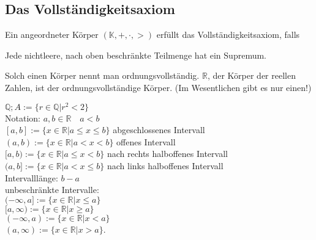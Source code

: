 \documentclass[../ana1.tex]{subfiles}
\begin{document}
\subsection{Das Vollständigkeitsaxiom}
\begin{defi}
	Ein angeordneter Körper \( (\mathbb{K},+,\cdot,>)\) erfüllt das Vollständigkeitsaxiom, falls
	\begin{center}
		Jede nichtleere, nach oben beschränkte Teilmenge hat ein Supremum.
	\end{center}
	Solch einen Körper nennt man ordnungsvollständig. \(\mathbb{R}\), der Körper der reellen Zahlen, ist der ordnungsvollständige Körper. (Im Wesentlichen gibt es nur einen!)
\end{defi}
\( \mathbb{Q}; A:= \{r\in\mathbb{Q}|r^2 < 2\} \) \\
Notation: 
\(a,b\in\mathbb{R} \quad a<b\) \\
\([a,b] := \{x\in\mathbb{R}|a\leq x\leq b\} \) abgeschlossenes Intervall\\
\((a,b) := \{x\in\mathbb{R} | a<x<b\} \) offenes Intervall\\
\([a,b) := \{x\in\mathbb{R}|a\leq x<b\} \) nach rechts halboffenes Intervall\\
\((a,b] := \{x\in\mathbb{R}|a<x\leq b\} \) nach links halboffenes Intervall\\
Intervalllänge: \(b-a\) \\
unbeschränkte Intervalle:\\
\((-\infty, a] := \{x\in\mathbb{R}|x\leq a\}\) \\
\([a,\infty) := \{x\in\mathbb{R}|x\geq a\} \) \\
\((-\infty, a) := \{x\in\mathbb{R}|x<a\} \) \\
\((a, \infty) := \{x\in\mathbb{R}|x>a\} \).
\end{document}
